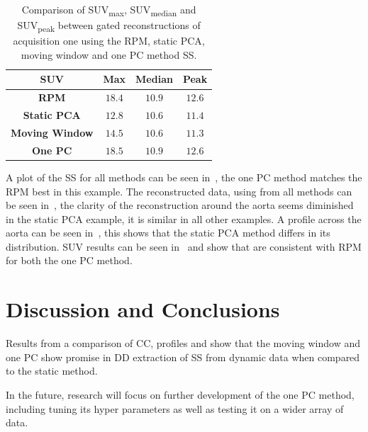     \begin{table}
        \vspace{-0.5cm}
        \centering
        \captionsetup{singlelinecheck=false, justification=centering}
        \caption{Comparison of \gls{SUV}\textsubscript{max}, \gls{SUV}\textsubscript{median} and \gls{SUV}\textsubscript{peak} between gated reconstructions of acquisition one using the \gls{RPM}, static \gls{PCA}, moving window and one \gls{PC} method \gls{SS}.}
        
        \resizebox*{0.75\linewidth}{!}
        {
            \begin{tabular}{||c|ccc||}
                \hline
                \textbf{\gls{SUV}} & \textbf{Max} & \textbf{Median} & \textbf{Peak} \\
                \hline
                \textbf{\gls{RPM}}          & $18.4$ & $10.9$ & $12.6$ \\
                \hline
                \textbf{Static \gls{PCA}}   & $12.8$ & $10.6$ & $11.4$ \\
                \textbf{Moving Window}      & $14.5$ & $10.6$ & $11.3$ \\
                \textbf{One \gls{PC}}       & $18.5$ & $10.9$ & $12.6$ \\
                \hline
            \end{tabular}
        }
        \label{tab:suv}
        \vspace{-0.5cm}
    \end{table}
    
    A plot of the \gls{SS} for all methods can be seen in~, the one \gls{PC} method matches the \gls{RPM} best in this example. The reconstructed data, using  from all methods can be seen in~, the clarity of the reconstruction around the aorta seems diminished in the static \gls{PCA} example, it is similar in all other examples. A profile across the aorta can be seen in~, this shows that the static \gls{PCA} method differs in its distribution. \gls{SUV} results can be seen in~ and show that  are consistent with \gls{RPM} for both the one \gls{PC} method.
    
\vspace{-0.25cm}
    
\section{Discussion and Conclusions} \label{sec:discussion_and_conclusions}
    Results from a comparison of \gls{CC}, profiles and  show that the moving window and one \gls{PC} show promise in \gls{DD} extraction of \gls{SS} from dynamic data when compared to the static method.
    
    In the future, research will focus on further development of the one \gls{PC} method, including tuning its hyper parameters as well as testing it on a wider array of data.
